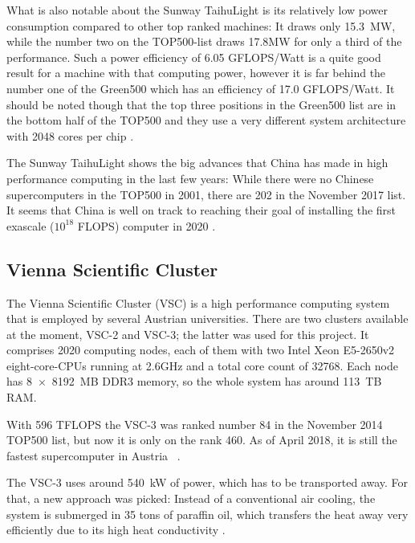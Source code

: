What is also notable about the Sunway TaihuLight is its relatively low power consumption compared to other top ranked machines: It draws only 15.3~MW, while the number two on the TOP500-list draws 17.8MW for only a third of the performance. Such a power efficiency of 6.05 GFLOPS/Watt is a quite good result for a machine with that computing power, however it is far behind the number one of the Green500 which has an efficiency of 17.0 GFLOPS/Watt. It should be noted though that the top three positions in the Green500 list are in the bottom half of the TOP500 and they use a very different system architecture with 2048 cores per chip \cite{green500}.

The Sunway TaihuLight shows the big advances that China has made in high performance computing in the last few years: While there were no Chinese supercomputers in the TOP500 in 2001, there are 202 in the November 2017 list. It seems that China is well on track to reaching their goal of installing the first exascale ($10^{18}$ FLOPS) computer in 2020 \cite{dongarra2016report}.

\subsection{Vienna Scientific Cluster}
\label{sec:vsc3}

The Vienna Scientific Cluster (VSC) is a high performance computing system that is employed by several Austrian universities. There are two clusters available at the moment, VSC-2 and VSC-3; the latter was used for this project. It comprises 2020 computing nodes, each of them with two Intel Xeon E5-2650v2 eight-core-CPUs running at 2.6GHz and a total core count of 32768. Each node has 8~$\times$~8192~MB DDR3 memory, so the whole system has around 113~TB RAM.

With 596 TFLOPS the VSC-3 was ranked number 84 in the November 2014 TOP500 list, but now it is only on the rank 460.  As of April 2018, it is still the fastest supercomputer in Austria ~\cite{top500n_VSC3}. 

The VSC-3 uses around 540~kW of power, which has to be transported away. For that, a new approach was picked: Instead of a conventional air cooling, the system is submerged in 35 tons of paraffin oil, which transfers the heat away very efficiently due to its high heat conductivity \cite{vsc_oil}.



